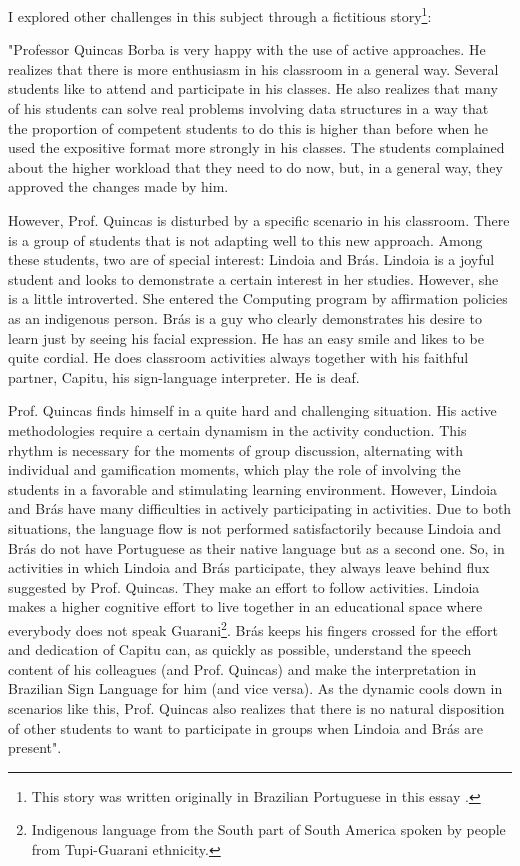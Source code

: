 I explored other challenges in this subject through a fictitious story\footnote{This story was written originally in Brazilian Portuguese in this essay \cite[pp.~277,278]{bispojr:2022-educomp}.}: 
\begin{citacao}
    "Professor Quincas Borba is very happy with the use of active approaches. He realizes that there is more enthusiasm in his classroom in a general way. Several students like to attend and participate in his classes. He also realizes that many of his students can solve real problems involving data structures in a way that the proportion of competent students to do this is higher than before when he used the expositive format more strongly in his classes. The students complained about the higher workload that they need to do now, but, in a general way, they approved the changes made by him.

    However, Prof. Quincas is disturbed by a specific scenario in his classroom. There is a group of students that is not adapting well to this new approach. Among these students, two are of special interest: Lindoia and Brás. Lindoia is a joyful student and looks to demonstrate a certain interest in her studies. However, she is a little introverted. She entered the Computing program by affirmation policies as an indigenous person. Brás is a guy who clearly demonstrates his desire to learn just by seeing his facial expression. He has an easy smile and likes to be quite cordial. He does classroom activities always together with his faithful partner, Capitu, his sign-language interpreter. He is deaf.

    Prof. Quincas finds himself in a quite hard and challenging situation. His active methodologies require a certain dynamism in the activity conduction. This rhythm is necessary for the moments of group discussion, alternating with individual and gamification moments, which play the role of involving the students in a favorable and stimulating learning environment. However, Lindoia and Brás have many difficulties in actively participating in activities. Due to both situations, the language flow is not performed satisfactorily because Lindoia and Brás do not have Portuguese as their native language but as a second one. So, in activities in which Lindoia and Brás participate, they always leave behind flux suggested by Prof. Quincas. They make an effort to follow activities. Lindoia makes a higher cognitive effort to live together in an educational space where everybody does not speak Guarani\footnote{Indigenous language from the South part of South America spoken by people from Tupi-Guarani ethnicity.}. Brás keeps his fingers crossed for the effort and dedication of Capitu can, as quickly as possible, understand the speech content of his colleagues (and Prof. Quincas) and make the interpretation in Brazilian Sign Language for him (and vice versa). As the dynamic cools down in scenarios like this, Prof. Quincas also realizes that there is no natural disposition of other students to want to participate in groups when Lindoia and Brás are present".
\end{citacao}
